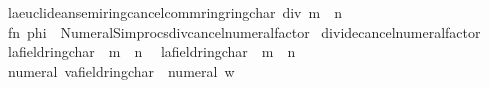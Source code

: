 \begin{isabellebody}
\ \ {\isacharbar}{\kern0pt}{\isachardoublequoteopen}{\isacharparenleft}{\kern0pt}l{\isacharcolon}{\kern0pt}{\isacharcolon}{\kern0pt}{\isacharprime}{\kern0pt}a{\isacharcolon}{\kern0pt}{\isacharcolon}{\kern0pt}{\isacharbraceleft}{\kern0pt}euclidean{\isacharunderscore}{\kern0pt}semiring{\isacharunderscore}{\kern0pt}cancel{\isacharcomma}{\kern0pt}comm{\isacharunderscore}{\kern0pt}ring{\isacharunderscore}{\kern0pt}{}{\isacharcomma}{\kern0pt}ring{\isacharunderscore}{\kern0pt}char{\isacharunderscore}{\kern0pt}{}{\isacharbraceright}{\kern0pt}{\isacharparenright}{\kern0pt}\ div\ {\isacharparenleft}{\kern0pt}m\ {\isacharasterisk}{\kern0pt}\ n{\isacharparenright}{\kern0pt}{\isachardoublequoteclose}{\isacharparenright}{\kern0pt}\ {\isacharequal}{\kern0pt}\isanewline
\ \ {\isacartoucheopen}fn\ phi\ {\isacharequal}{\kern0pt}{\isachargreater}{\kern0pt}\ Numeral{\isacharunderscore}{\kern0pt}Simprocs{\isachardot}{\kern0pt}div{\isacharunderscore}{\kern0pt}cancel{\isacharunderscore}{\kern0pt}numeral{\isacharunderscore}{\kern0pt}factor{\isacartoucheclose}\isanewline
\isanewline
{}\isamarkupfalse%
\ divide{\isacharunderscore}{\kern0pt}cancel{\isacharunderscore}{\kern0pt}numeral{\isacharunderscore}{\kern0pt}factor\isanewline
\ \ {\isacharparenleft}{\kern0pt}{\isachardoublequoteopen}{\isacharparenleft}{\kern0pt}{\isacharparenleft}{\kern0pt}l{\isacharcolon}{\kern0pt}{\isacharcolon}{\kern0pt}{\isacharprime}{\kern0pt}a{\isacharcolon}{\kern0pt}{\isacharcolon}{\kern0pt}{\isacharbraceleft}{\kern0pt}field{\isacharcomma}{\kern0pt}ring{\isacharunderscore}{\kern0pt}char{\isacharunderscore}{\kern0pt}{}{\isacharbraceright}{\kern0pt}{\isacharparenright}{\kern0pt}\ {\isacharasterisk}{\kern0pt}\ m{\isacharparenright}{\kern0pt}\ {\isacharslash}{\kern0pt}\ n{\isachardoublequoteclose}\isanewline
\ \ {\isacharbar}{\kern0pt}{\isachardoublequoteopen}{\isacharparenleft}{\kern0pt}l{\isacharcolon}{\kern0pt}{\isacharcolon}{\kern0pt}{\isacharprime}{\kern0pt}a{\isacharcolon}{\kern0pt}{\isacharcolon}{\kern0pt}{\isacharbraceleft}{\kern0pt}field{\isacharcomma}{\kern0pt}ring{\isacharunderscore}{\kern0pt}char{\isacharunderscore}{\kern0pt}{}{\isacharbraceright}{\kern0pt}{\isacharparenright}{\kern0pt}\ {\isacharslash}{\kern0pt}\ {\isacharparenleft}{\kern0pt}m\ {\isacharasterisk}{\kern0pt}\ n{\isacharparenright}{\kern0pt}{\isachardoublequoteclose}\isanewline
\ \ {\isacharbar}{\kern0pt}{\isachardoublequoteopen}{\isacharparenleft}{\kern0pt}{\isacharparenleft}{\kern0pt}numeral\ v{\isacharparenright}{\kern0pt}{\isacharcolon}{\kern0pt}{\isacharcolon}{\kern0pt}{\isacharprime}{\kern0pt}a{\isacharcolon}{\kern0pt}{\isacharcolon}{\kern0pt}{\isacharbraceleft}{\kern0pt}field{\isacharcomma}{\kern0pt}ring{\isacharunderscore}{\kern0pt}char{\isacharunderscore}{\kern0pt}{}{\isacharbraceright}{\kern0pt}{\isacharparenright}{\kern0pt}\ {\isacharslash}{\kern0pt}\ {\isacharparenleft}{\kern0pt}numeral\ w{\isacharparenright}{\kern0pt}{\isachardoublequoteclose}{\isacharparenright}{\kern0pt}\ {\isacharequal}{\kern0pt}\isanewline

\end{isabellebody}

